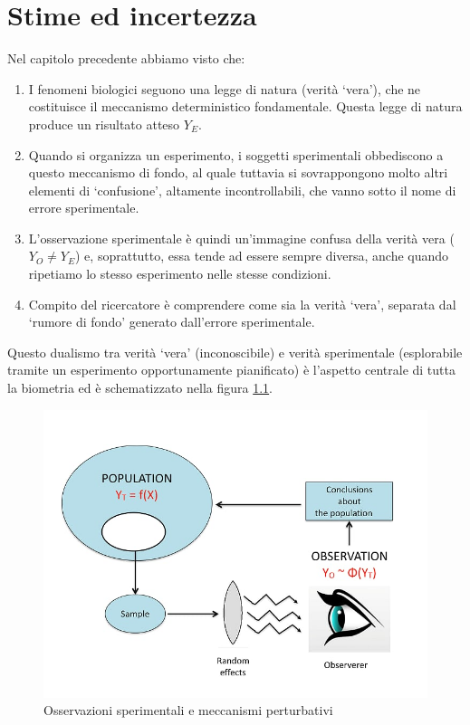 \documentclass[a4paper,12pt,oneside]{book}
\providecommand{\tightlist}{%
  \setlength{\itemsep}{0pt}\setlength{\parskip}{0pt}}
\begin{document}
\hypertarget{stime-ed-incertezza}{%
\chapter{Stime ed incertezza}\label{stime-ed-incertezza}}

Nel capitolo precedente abbiamo visto che:

\begin{enumerate}
\def\labelenumi{\arabic{enumi}.}
\tightlist
\item
  I fenomeni biologici seguono una legge di natura (verità `vera'), che ne costituisce il meccanismo deterministico fondamentale. Questa legge di natura produce un risultato atteso \(Y_E\).
\item
  Quando si organizza un esperimento, i soggetti sperimentali obbediscono a questo meccanismo di fondo, al quale tuttavia si sovrappongono molto altri elementi di `confusione', altamente incontrollabili, che vanno sotto il nome di errore sperimentale.
\item
  L'osservazione sperimentale è quindi un'immagine confusa della verità vera (\(Y_O \neq Y_E\)) e, soprattutto, essa tende ad essere sempre diversa, anche quando ripetiamo lo stesso esperimento nelle stesse condizioni.
\item
  Compito del ricercatore è comprendere come sia la verità `vera', separata dal `rumore di fondo' generato dall'errore sperimentale.
\end{enumerate}

Questo dualismo tra verità `vera' (inconoscibile) e verità sperimentale (esplorabile tramite un esperimento opportunamente pianificato) è l'aspetto centrale di tutta la biometria ed è schematizzato nella figura \ref{fig:figName61}.

\begin{figure}

{\centering \includegraphics[width=0.75\linewidth]{_images/InferenceProcess} 

}

\caption{Osservazioni sperimentali e meccanismi perturbativi}\label{fig:figName61}
\end{figure}
\end{document}

